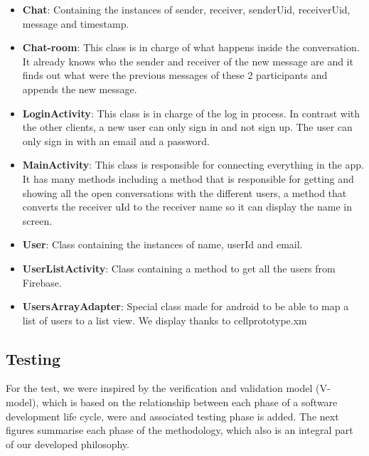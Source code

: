 \begin{itemize}
	\item \textbf{Chat}: Containing the instances of sender, receiver, senderUid, receiverUid, message and timestamp.
	
	\item \textbf{Chat-room}: This class is in charge of what happens inside the conversation. It already knows who the sender and receiver of the new message are and it finds out what were the previous messages of these 2 participants and appends the new message. 
	
	\item \textbf{LoginActivity}: This class is in charge of the log in process. In contrast with the other clients, a new user can only sign in and not sign up. The user can only sign in with an email and a password.
	
	\item \textbf{MainActivity}: This class is responsible for connecting everything in the app. It has many methods including a method that is responsible for getting and showing all the open conversations with the different users, a method that converts the receiver uId to the receiver name so it can display the name in screen.
	
	\item \textbf{User}: Class containing the instances of name, userId and email.
	
	\item \textbf{UserListActivity}: Class containing a method to get all the users from Firebase.

	\item \textbf{UsersArrayAdapter}: Special class made for android to be able to map a list of users to a list view. We display thanks to cellprototype.xm
\end{itemize}




\subsection{Testing}

For the test, we were inspired by the verification and validation model (V- model), which is based on the relationship between each phase of a software development life cycle, were and associated testing phase is added.   The next figures summarise each phase of the methodology, which also is an integral part of our developed philosophy. 

